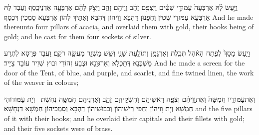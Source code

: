 {וַיַּ֣עַשׂ לָ֗הּ אַרְבָּעָה֙ עַמּוּדֵ֣י שִׁטִּ֔ים וַיְצַפֵּ֣ם זָהָ֔ב וָוֵיהֶ֖ם זָהָ֑ב וַיִּצֹ֣ק לָהֶ֔ם אַרְבָּעָ֖ה אַדְנֵי\maqqaf כָֽסֶף׃}
{וַעֲבַד לַהּ אַרְבְּעָא עַמּוּדֵי שִׁטִּין וַחֲפָנוּן דַּהְבָּא וָוֵיהוֹן דַּהְבָּא וְאַתֵּיךְ לְהוֹן אַרְבְּעָא סָמְכִין דִּכְסַף׃}
{And he made thereunto four pillars of acacia, and overlaid them with gold, their hooks being of gold; and he cast for them four sockets of silver.}{}

{וַיַּ֤עַשׂ מָסָךְ֙ לְפֶ֣תַח הָאֹ֔הֶל תְּכֵ֧לֶת וְאַרְגָּמָ֛ן וְתוֹלַ֥עַת שָׁנִ֖י וְשֵׁ֣שׁ מׇשְׁזָ֑ר מַעֲשֵׂ֖ה רֹקֵֽם׃}
{וַעֲבַד פְּרָסָא לִתְרַע מַשְׁכְּנָא דְּתַכְלָא וְאַרְגְּוָנָא וּצְבַע זְהוֹרִי וּבוּץ שְׁזִיר עוֹבָד צַיָּיר׃}
{And he made a screen for the door of the Tent, of blue, and purple, and scarlet, and fine twined linen, the work of the weaver in colours;}{}

{וְאֶת\maqqaf עַמּוּדָ֤יו חֲמִשָּׁה֙ וְאֶת\maqqaf וָ֣וֵיהֶ֔ם וְצִפָּ֧ה רָאשֵׁיהֶ֛ם וַחֲשֻׁקֵיהֶ֖ם זָהָ֑ב וְאַדְנֵיהֶ֥ם חֲמִשָּׁ֖ה נְחֹֽשֶׁת׃ \petucha }
{וְיָת עַמּוּדוֹהִי חַמְשָׁא וְיָת וָוֵיהוֹן וְחַפִּי רֵישֵׁיהוֹן וְכִבּוּשֵׁיהוֹן דַּהְבָּא וְסָמְכֵיהוֹן חַמְשָׁא דִּנְחָשָׁא׃}
{and the five pillars of it with their hooks; and he overlaid their capitals and their fillets with gold; and their five sockets were of brass.}{}

